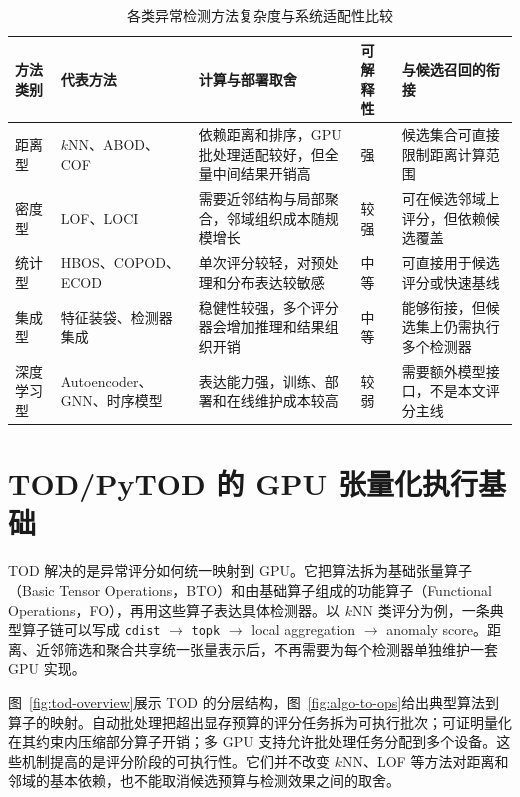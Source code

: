 \begin{table}[htbp]
  \caption{各类异常检测方法复杂度与系统适配性比较}
  \label{tab:ad-complexity}
  \centering
  \small
  \setlength{\tabcolsep}{3pt}
  \renewcommand{\arraystretch}{1.25}
  \begin{tabularx}{\linewidth}{@{}P{1.65cm}P{2.55cm}Y P{1.7cm}Y@{}}
    \toprule
    方法类别 & 代表方法 & 计算与部署取舍 & 可解释性 & 与候选召回的衔接 \\
    \midrule
    距离型 & $k$NN、ABOD、COF & 依赖距离和排序，GPU 批处理适配较好，但全量中间结果开销高 & 强 & 候选集合可直接限制距离计算范围 \\
    密度型 & LOF、LOCI & 需要近邻结构与局部聚合，邻域组织成本随规模增长 & 较强 & 可在候选邻域上评分，但依赖候选覆盖 \\
    统计型 & HBOS、COPOD、ECOD & 单次评分较轻，对预处理和分布表达较敏感 & 中等 & 可直接用于候选评分或快速基线 \\
    集成型 & 特征装袋、检测器集成 & 稳健性较强，多个评分器会增加推理和结果组织开销 & 中等 & 能够衔接，但候选集上仍需执行多个检测器 \\
    深度学习型 & Autoencoder、GNN、时序模型 & 表达能力强，训练、部署和在线维护成本较高 & 较弱 & 需要额外模型接口，不是本文评分主线 \\
    \bottomrule
  \end{tabularx}
\end{table}

\section{TOD/PyTOD 的 GPU 张量化执行基础}

TOD 解决的是异常评分如何统一映射到 GPU。它把算法拆为基础张量算子（Basic Tensor Operations，BTO）和由基础算子组成的功能算子（Functional Operations，FO），再用这些算子表达具体检测器\citep{zhao2022tod}。以 $k$NN 类评分为例，一条典型算子链可以写成 \texttt{cdist} $\rightarrow$ \texttt{topk} $\rightarrow$ local aggregation $\rightarrow$ anomaly score。距离、近邻筛选和聚合共享统一张量表示后，不再需要为每个检测器单独维护一套 GPU 实现。

图~\ref{fig:tod-overview}展示 TOD 的分层结构，图~\ref{fig:algo-to-ops}给出典型算法到算子的映射。自动批处理把超出显存预算的评分任务拆为可执行批次；可证明量化在其约束内压缩部分算子开销；多 GPU 支持允许批处理任务分配到多个设备。这些机制提高的是评分阶段的可执行性。它们并不改变 $k$NN、LOF 等方法对距离和邻域的基本依赖，也不能取消候选预算与检测效果之间的取舍\citep{zhao2022tod}。

